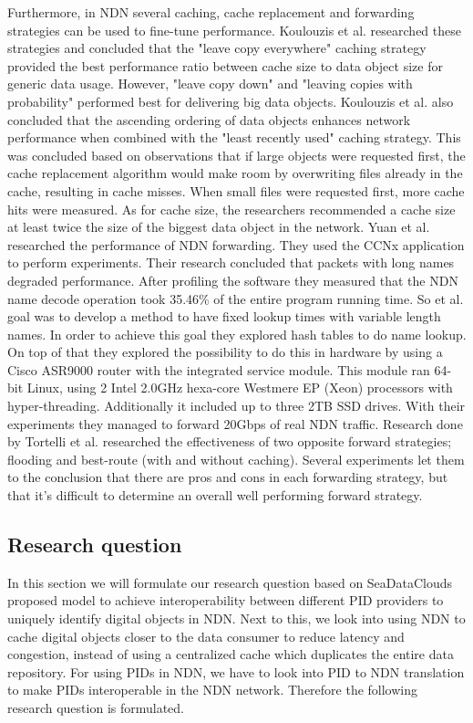Furthermore, in NDN several caching, cache replacement and forwarding strategies can be used to fine-tune performance. Koulouzis et al. researched these strategies and concluded that the "leave copy everywhere" caching strategy provided the best performance ratio between cache size to data object size for generic data usage. However, "leave copy down" and "leaving copies with probability" performed best for delivering big data objects. Koulouzis et al. also concluded that the ascending ordering of data objects enhances network performance when combined with the "least recently used" caching strategy. This was concluded based on observations that if large objects were requested first, the cache replacement algorithm would make room by overwriting files already in the cache, resulting in cache misses. When small files were requested first, more cache hits were measured. As for cache size, the researchers recommended a cache size at least twice the size of the biggest data object in the network. Yuan et al. \cite{yuan2012scalable} researched the performance of NDN forwarding. They used the CCNx application to perform experiments. Their research concluded that packets with long names degraded performance. After profiling the software they measured that the NDN name decode operation took 35.46\% of the entire program running time. So et al. \cite{so2013named} goal was to develop a method to have fixed lookup times with variable length names. In order to achieve this goal they explored hash tables to do name lookup. On top of that they explored the possibility to do this in hardware by using a Cisco ASR9000 router with the integrated service module. This module ran 64-bit Linux, using 2 Intel 2.0GHz hexa-core Westmere EP (Xeon) processors with hyper-threading. Additionally it included up to three 2TB SSD drives. With their experiments they managed to forward 20Gbps of real NDN traffic. Research done by Tortelli et al. \cite{tortelli2013performance} researched the effectiveness of two opposite forward strategies; flooding and best-route (with and without caching). Several experiments let them to the conclusion that there are pros and cons in each forwarding strategy, but that it's difficult to determine an overall well performing forward strategy.

\subsection{Research question}
In this section we will formulate our research question based on SeaDataClouds proposed model to achieve interoperability between different PID providers to uniquely identify digital objects in NDN. Next to this, we look into using NDN to cache digital objects closer to the data consumer to reduce latency and congestion, instead of using a centralized cache which duplicates the entire data repository. For using PIDs in NDN, we have to look into PID to NDN translation to make PIDs interoperable in the NDN network. Therefore the following research question is formulated.

